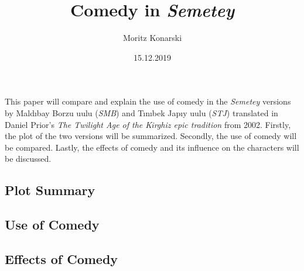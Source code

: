 \documentclass[12pt,a4paper]{article}
\newcommand{\Se}{Semetey}
\newcommand{\Mb}{Maldıbay Borzu uulu}
\newcommand{\Mbs}{\emph{SMB}}
\newcommand{\Tj}{Tınıbek Japıy uulu}
\newcommand{\Tjs}{\emph{STJ}}
\newcommand{\Dp}{Daniel Prior}
\newcommand{\Dpt}{The Twilight Age of the Kirghiz epic tradition}
\begin{document}
\title{Comedy in \emph{Semetey}}
\author{Moritz Konarski}
\date{15.12.2019}
\maketitle

This paper will compare and explain the use of comedy in the \emph{\Se{}}
versions by \Mb{} (\Mbs{}) and \Tj{} (\Tjs{}) translated in \Dp{}'s \emph{\Dpt} from 2002. 
Firstly, the plot of the two versions will be summarized. Secondly,
the use of comedy will be compared. Lastly, the effects of comedy and its 
influence on the characters will be discussed.


\subsection*{Plot Summary}




\subsection*{Use of Comedy}




\subsection*{Effects of Comedy}
\end{document}
